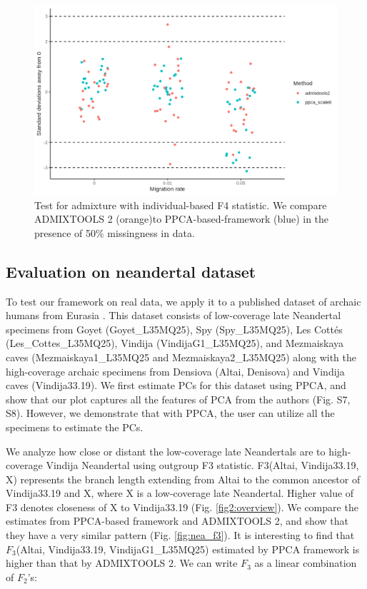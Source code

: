 \documentclass[12pt, letterpaper]{article}
\begin{document}
\begin{figure}[ht!]
    \includegraphics[width=16.5cm]{plots/simfiles/AvgFolder/Ne1000/split_times1000/npop10_nind100/missing0.5/plots_8/hypothesis_test_comparison.png}
    \centering
         \caption{Test for admixture with individual-based F4 statistic. We compare ADMIXTOOLS 2 (orange)to PPCA-based-framework (blue) in the presence of 50\% missingness in data.}
    \label{fig:admixture}
\end{figure}

\subsection{Evaluation on neandertal dataset}

To test our framework on real data, we apply it to a published dataset of archaic humans from Eurasia \cite{hajdinjak}. This dataset consists of low-coverage late Neandertal specimens from Goyet (Goyet\_L35MQ25), Spy (Spy\_L35MQ25), Les Cottés (Les\_Cottes\_L35MQ25), Vindija (VindijaG1\_L35MQ25), and Mezmaiskaya caves (Mezmaiskaya1\_L35MQ25 and Mezmaiskaya2\_L35MQ25) along with the high-coverage archaic specimens from Densiova (Altai, Denisova) and Vindija caves (Vindija33.19). We first estimate PCs for this dataset using PPCA, and show that our plot captures all the features of PCA from the authors (Fig. S7, S8). However, we demonstrate that with PPCA, the user can utilize all the specimens to estimate the PCs. 

We analyze how close or distant the low-coverage late Neandertals are to high-coverage Vindija Neandertal using outgroup F3 statistic. F3(Altai, Vindija33.19, X) represents the branch length extending from Altai to the common ancestor of Vindija33.19 and X, where X is a low-coverage late Neandertal. Higher value of F3 denotes closeness of X to Vindija33.19 (Fig. \ref{fig2:overview}). We compare the estimates from PPCA-based framework and ADMIXTOOLS 2, and show that they have a very similar pattern (Fig. \ref{fig:nea_f3}). It is interesting to find that $F_3$(Altai, Vindija33.19, VindijaG1\_L35MQ25) estimated by PPCA framework is higher than that by ADMIXTOOLS 2. We can write $F_3$ as a linear combination of $F_2$'s:
\end{document}
